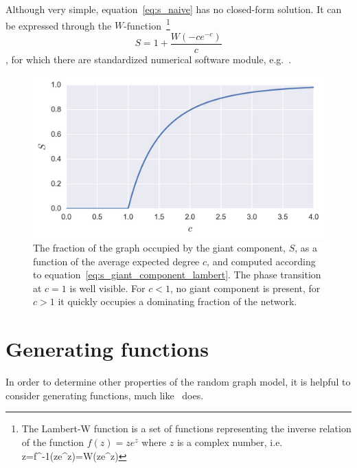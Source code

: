 \noindent Although very simple, equation~\ref{eq:s_naive} has no closed-form solution.
It can be expressed through the \Lambert $W$-function~\footnote{The Lambert-W function is a set of functions representing the inverse relation of the function $f(z) = z e^{z}$ where $z$ is a complex number, i.e. {\displaystyle\, z=f^{-1}(ze^{z})=W(ze^{z})}}
\begin{equation}
S = 1 + \frac{W(-c e^{-c})}{c}
\label{eq:s_giant_component_lambert}
\end{equation}
\noindent, for which there are standardized numerical software module, e.g.~\cite{sympy}.

\begin{figure}[tb]
	\centering
	\includegraphics[]{figures/2_s_as_function_of_c.png}
	\caption{The fraction of the graph occupied by the giant component, $S$, as a function of the average expected degree $c$, and computed according to equation~\ref{eq:s_giant_component_lambert}. The phase transition at $c=1$ is well visible. For $c < 1$, no giant component is present, for $c>1$ it quickly occupies a dominating fraction of the network.}
	\label{fig:s_as_function_of_c}
\end{figure}



\section{Generating functions} %
\label{sec:generating_functions}

In order to determine other properties of the random graph model, it is helpful to consider generating functions, much like~\cite{Newman:zFi032Kd} does.


